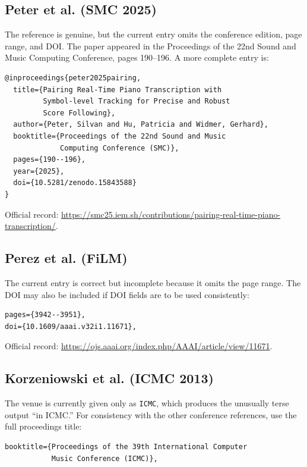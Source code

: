 \documentclass[11pt]{article}
\begin{document}
\subsection{Peter et al. (SMC 2025)}

The reference is genuine, but the current entry omits the conference edition, page range, and DOI. The paper appeared in the Proceedings of the 22nd Sound and Music Computing Conference, pages 190--196. A more complete entry is:

\begin{verbatim}
@inproceedings{peter2025pairing,
  title={Pairing Real-Time Piano Transcription with
         Symbol-level Tracking for Precise and Robust
         Score Following},
  author={Peter, Silvan and Hu, Patricia and Widmer, Gerhard},
  booktitle={Proceedings of the 22nd Sound and Music
             Computing Conference (SMC)},
  pages={190--196},
  year={2025},
  doi={10.5281/zenodo.15843588}
}
\end{verbatim}

Official record: \url{https://smc25.iem.sh/contributions/pairing-real-time-piano-transcription/}.

\subsection{Perez et al. (FiLM)}

The current entry is correct but incomplete because it omits the page range. The DOI may also be included if DOI fields are to be used consistently:

\begin{verbatim}
pages={3942--3951},
doi={10.1609/aaai.v32i1.11671},
\end{verbatim}

Official record: \url{https://ojs.aaai.org/index.php/AAAI/article/view/11671}.

\subsection{Korzeniowski et al. (ICMC 2013)}

The venue is currently given only as \texttt{ICMC}, which produces the unusually terse output ``in ICMC.'' For consistency with the other conference references, use the full proceedings title:

\begin{verbatim}
booktitle={Proceedings of the 39th International Computer
           Music Conference (ICMC)},
\end{verbatim}
\end{document}
